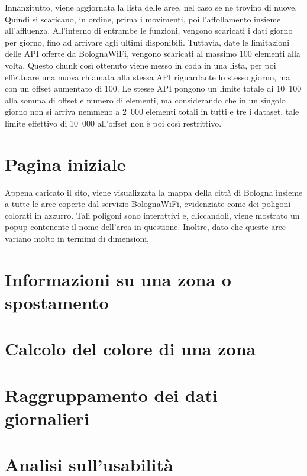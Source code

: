 Innanzitutto, viene aggiornata la lista delle aree, nel caso se ne trovino di nuove. Quindi si scaricano, in ordine, prima i movimenti, poi l'affollamento insieme all'affluenza. All'interno di entrambe le funzioni, vengono scaricati i dati giorno per giorno, fino ad arrivare agli ultimi disponibili. Tuttavia, date le limitazioni delle API offerte da BolognaWiFi, vengono scaricati al massimo 100 elementi alla volta. Questo chunk così ottenuto viene messo in coda in una lista, per poi effettuare una nuova chiamata alla stessa API riguardante lo stesso giorno, ma con un offset aumentato di 100. Le stesse API pongono un limite totale di 10~100 alla somma di offset e numero di elementi, ma considerando che in un singolo giorno non si arriva nemmeno a 2~000 elementi totali in tutti e tre i dataset, tale limite effettivo di 10~000 all'offset non è poi così restrittivo.

\section{Pagina iniziale}
Appena caricato il sito, viene visualizzata la mappa della città di Bologna insieme a tutte le aree coperte dal servizio BolognaWiFi, evidenziate come dei poligoni colorati in azzurro. Tali poligoni sono interattivi e, cliccandoli, viene mostrato un popup contenente il nome dell'area in questione. Inoltre, dato che queste aree variano molto in termimi di dimensioni, 

\section{Informazioni su una zona o spostamento}
\section{Calcolo del colore di una zona}
\section{Raggruppamento dei dati giornalieri}
\section{Analisi sull'usabilità}


